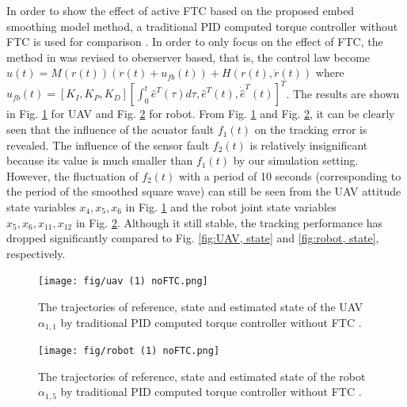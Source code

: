 \documentclass{ieeeaccess}
\begin{document}
In order to show the effect of active FTC based on the proposed embed smoothing model method, a traditional PID computed torque controller without FTC is used for comparison \cite{7456706}. In order to only focus on the effect of FTC, the method in \cite{7456706} was revised to oberserver based, that is, the control law become $u(t)= M(r(t))(\ddot{r}(t) + u_{fb}(t)) + H(r(t),\dot{r}(t))$ where $u_{fb}(t) = [K_I, K_P, K_D][\int_{0}^{t}\hat{e}^T(\tau)d\tau, \hat{e}^T(t), \dot{\hat{e}}^T(t)]^T$. The results are shown in Fig. \ref{fig:uav, state, noFTC} for UAV and Fig. \ref{fig:robot, state, noFTC} for robot. From Fig. \ref{fig:uav, state, noFTC} and Fig. \ref{fig:robot, state, noFTC}, it can be clearly seen that the influence of the acuator fault $f_1(t)$ on the tracking error is revealed. The influence of the sensor fault $f_2(t)$ is relatively insignificant because its value is much smaller than $f_1(t)$ by our simulation setting. However, the fluctuation of $f_2(t)$ with a period of 10 seconds (corresponding to the period of the smoothed square wave) can still be seen from the UAV attitude state variables $x_4,x_5,x_6$ in Fig. \ref{fig:uav, state, noFTC} and the robot joint state variables $x_5,x_6,x_{11},x_{12}$ in Fig. \ref{fig:robot, state, noFTC}. Although it still stable, the tracking performance has dropped significantly compared to Fig. \ref{fig:UAV, state} and \ref{fig:robot, state}, respectively.
\begin{figure}[htbp]
    \centering
    \texttt{[image: fig/uav (1) noFTC.png]}\caption{The trajectories of reference, state and estimated state of the UAV $\alpha_{1,1}$ by traditional PID computed torque controller without FTC \cite{7456706}.}%
    \label{fig:uav, state, noFTC}
\end{figure}
\begin{figure}[htbp]
    \centering
    \texttt{[image: fig/robot (1) noFTC.png]}\caption{The trajectories of reference, state and estimated state of the robot $\alpha_{1,5}$ by traditional PID computed torque controller without FTC \cite{7456706}.}%
    \label{fig:robot, state, noFTC}
\end{figure}
\end{document}
